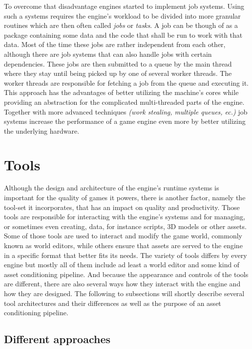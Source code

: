 To overcome that disadvantage engines started to implement job systems. Using such a systems requires the engine's workload to be divided into more granular routines which are then often called \textit{jobs} or \textit{tasks}.  A job can be though of as a package containing some data and the code that shall be run to work with that data. Most of the time these jobs are rather independent from each other, although there are job systems that can also handle jobs with certain dependencies. These jobs are then submitted to a queue by the main thread where they stay until being picked up by one of several worker threads. The worker threads are responsible for fetching a job from the queue and executing it. This approach has the advantages of better utilizing the machine's cores while providing an abstraction for the complicated multi-threaded parts of the engine. Together with more advanced techniques \textit{(work stealing, multiple queues, ec.)} job systems increase the performance of a game engine even more by better utilizing the underlying hardware.

\section{Tools}

Although the design and architecture of the engine's runtime systems is important for the quality of games it powers, there is another factor, namely the tool-set it incorporates, that has an impact on quality and productivity. Those tools are responsible for interacting with the engine's systems and for managing, or sometimes even creating, data, for instance scripts, 3D models or other assets. Some of those tools are used to interact and modify the game world, commonly known as world editors, while others ensure that assets are served to the engine in a specific format that better fits its needs. The variety of tools differs by every engine but mostly all of them include ad least a world editor and some kind of asset conditioning pipeline. And because the appearance and controls of the tools are different, there are also several ways how they interact with the engine and how they are designed. The following to subsections will shortly describe several tool architectures  and their differences as well as the purpose of an asset conditioning pipeline.

\subsection{Different approaches}


